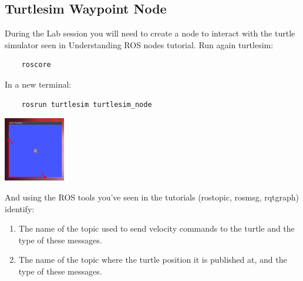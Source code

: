 \documentclass[a4paper,10pt]{article}
\begin{document}
\subsection{Turtlesim Waypoint Node}
During the Lab session you will need to create a node to interact with the turtle simulator seen in Understanding ROS nodes tutorial.
Run again turtlesim:
\begin{verbatim}
    roscore
\end{verbatim}
\noindent
In a new terminal:
\begin{verbatim}
    rosrun turtlesim turtlesim_node
\end{verbatim}

\begin{center}
    \includegraphics[width=0.2\textwidth]{pict/lab0}
    \label{sim}
\end{center}

\noindent
And using the ROS tools you’ve seen in the tutorials (rostopic, rosmsg, rqt{\textunderscore}graph) identify:
\begin{enumerate}
    \item The name of the topic used to send velocity commands to the turtle and the type of these messages.
    \item The name of the topic where the turtle position it is published at, and the type of these messages.
\end{enumerate}
\end{document}
